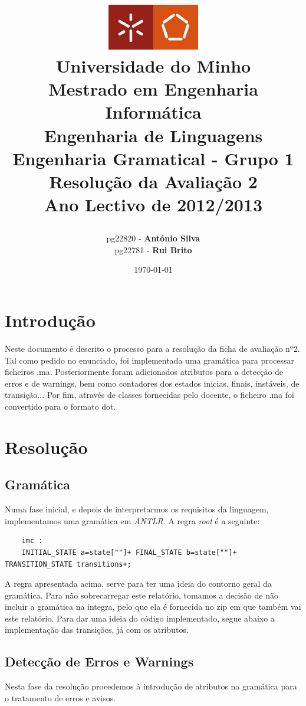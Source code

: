 \documentclass[a4paper,11pt,openright,openbib]{article}
\title{
	\large{\includegraphics[width=0.3\textwidth]{UM.jpg}} \\
	\large{Universidade do Minho}  \\
	\large{Mestrado em Engenharia Informática}  \\
	\large{Engenharia de Linguagens}  \\
	\large{Engenharia Gramatical - Grupo 1}  \\	
	\large{\textbf{Resolução da Avaliação 2}} \\
	\large{Ano Lectivo de 2012/2013} \\
	\date{\today}
}
\author{	
	\begin{tabular}[t]{c c}      
        pg22820 - \textbf{António Silva} \\        
		pg22781 - \textbf{Rui Brito} \\   				
	\\ 
	\end{tabular}
}
\begin{document}
\maketitle


\pagestyle{headings}
\newpage
\tableofcontents
\newpage

\section{Introdução}
Neste documento é descrito o processo para a resolução da ficha de avaliação nº2. Tal como pedido no enunciado, foi implementada uma gramática para processar ficheiros .ma. Posteriormente foram adicionados atributos para a detecção de erros e de warnings, bem como contadores dos estados inicias, finais, instáveis, de transição... Por fim, através de classes fornecidas pelo docente, o ficheiro .ma foi convertido para o formato dot.

\section{Resolução} %
\label{sec:resolucao}

\subsection{Gramática} %
\label{sub:gram_tica}

Numa fase inicial, e depois de interpretarmos os requisitos da linguagem, implementamos uma gramática em \emph{ANTLR}.
A regra \emph{root} é a seguinte:
\small
\begin{verbatim}
	imc	:	
    INITIAL_STATE a=state[""]+ FINAL_STATE b=state[""]+ TRANSITION_STATE transitions+;
\end{verbatim}

A regra apresentada acima, serve para ter uma ideia do contorno geral da gramática. Para não sobrecarregar este relatório, tomamos a decisão de não incluir a gramática na integra, pelo que ela é fornecida no zip em que também vai este relatório. Para dar uma ideia do código implementado, segue abaixo a implementação das transições, já com os atributos.

\normalsize

\subsection{Detecção de Erros e Warnings} %
\label{sub:detec_o_de_erros_e_warnings}
Nesta fase da resolução procedemos à introdução de atributos na gramática para o tratamento de erros e avisos. 
\end{document}
